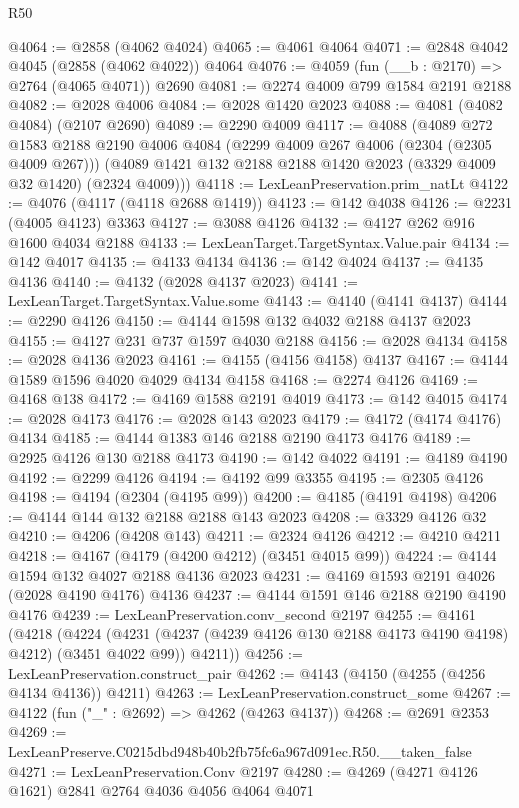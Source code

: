 \begin{lexlean}{R50}
\begin{coremodule}
@4064 := @2858 (@4062 @4024)
@4065 := @4061 @4064
@4071 := @2848 @4042 @4045 (@2858 (@4062 @4022)) @4064
@4076 := @4059 (fun (__b : @2170) => @2764 (@4065 @4071)) @2690
@4081 := @2274 @4009 @799 @1584 @2191 @2188
@4082 := @2028 @4006
@4084 := @2028 @1420 @2023
@4088 := @4081 (@4082 @4084) (@2107 @2690)
@4089 := @2290 @4009
@4117 := @4088
    (@4089
      @272
      @1583
      @2188
      @2190
      @4006
      @4084
      (@2299 @4009 @267 @4006 (@2304 (@2305 @4009 @267)))
      (@4089 @1421 @132 @2188 @2188 @1420 @2023 (@3329 @4009 @32 @1420) (@2324 @4009)))
@4118 := LexLeanPreservation.prim_natLt
@4122 := @4076 (@4117 (@4118 @2688 @1419))
@4123 := @142 @4038
@4126 := @2231 (@4005 @4123) @3363
@4127 := @3088 @4126
@4132 := @4127 @262 @916 @1600 @4034 @2188
@4133 := LexLeanTarget.TargetSyntax.Value.pair
@4134 := @142 @4017
@4135 := @4133 @4134
@4136 := @142 @4024
@4137 := @4135 @4136
@4140 := @4132 (@2028 @4137 @2023)
@4141 := LexLeanTarget.TargetSyntax.Value.some
@4143 := @4140 (@4141 @4137)
@4144 := @2290 @4126
@4150 := @4144 @1598 @132 @4032 @2188 @4137 @2023
@4155 := @4127 @231 @737 @1597 @4030 @2188
@4156 := @2028 @4134
@4158 := @2028 @4136 @2023
@4161 := @4155 (@4156 @4158) @4137
@4167 := @4144 @1589 @1596 @4020 @4029 @4134 @4158
@4168 := @2274 @4126
@4169 := @4168 @138
@4172 := @4169 @1588 @2191 @4019
@4173 := @142 @4015
@4174 := @2028 @4173
@4176 := @2028 @143 @2023
@4179 := @4172 (@4174 @4176) @4134
@4185 := @4144 @1383 @146 @2188 @2190 @4173 @4176
@4189 := @2925 @4126 @130 @2188 @4173
@4190 := @142 @4022
@4191 := @4189 @4190
@4192 := @2299 @4126
@4194 := @4192 @99 @3355
@4195 := @2305 @4126
@4198 := @4194 (@2304 (@4195 @99))
@4200 := @4185 (@4191 @4198)
@4206 := @4144 @144 @132 @2188 @2188 @143 @2023
@4208 := @3329 @4126 @32
@4210 := @4206 (@4208 @143)
@4211 := @2324 @4126
@4212 := @4210 @4211
@4218 := @4167 (@4179 (@4200 @4212) (@3451 @4015 @99))
@4224 := @4144 @1594 @132 @4027 @2188 @4136 @2023
@4231 := @4169 @1593 @2191 @4026 (@2028 @4190 @4176) @4136
@4237 := @4144 @1591 @146 @2188 @2190 @4190 @4176
@4239 := LexLeanPreservation.conv_second @2197
@4255 := @4161
    (@4218
      (@4224
        (@4231 (@4237 (@4239 @4126 @130 @2188 @4173 @4190 @4198) @4212) (@3451 @4022 @99))
        @4211))
@4256 := LexLeanPreservation.construct_pair
@4262 := @4143 (@4150 (@4255 (@4256 @4134 @4136)) @4211)
@4263 := LexLeanPreservation.construct_some
@4267 := @4122 (fun ("_" : @2692) => @4262 (@4263 @4137))
@4268 := @2691 @2353
@4269 := LexLeanPreserve.C0215dbd948b40b2fb75fc6a967d091ec.R50.__taken_false
@4271 := LexLeanPreservation.Conv @2197
@4280 := @4269 (@4271 @4126 @1621) @2841 @2764 @4036 @4056 @4064 @4071

\end{coremodule}
\end{lexlean}
